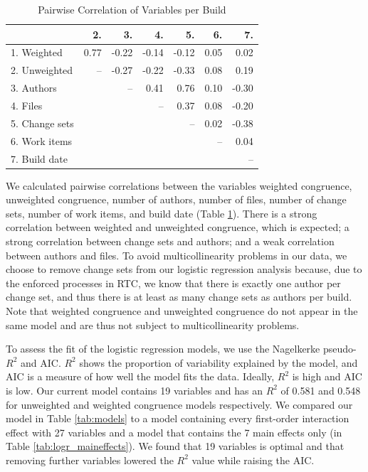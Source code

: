 \begin{table}[t]
\begin{center}
\begin{tabular}{l|rrrrrr}


 & 2. & 3. & 4. & 5. & 6. & 7. \\ 
  \hline
   1. Weighted & 0.77 & -0.22 & -0.14 & -0.12 & 0.05 & 0.02 \\ 
   2. Unweighted  &-- & -0.27 & -0.22 & -0.33 & 0.08 & 0.19 \\ 
   3. Authors &  & --& 0.41 & 0.76 & 0.10 & -0.30 \\ 
   4. Files &  &  & --& 0.37 & 0.08 & -0.20 \\ 
   5. Change sets &  &  &  &  --& 0.02 & -0.38 \\ 
   6. Work items  &  &  &  &  &  --& 0.04 \\ 
   7. Build date &  &  &  &  &  & -- \\ 
\hline

\end{tabular}
\end{center}
\caption{Pairwise Correlation of Variables per Build}
\label{tab:pairwise}
\end{table}

We calculated pairwise correlations between the variables weighted congruence, unweighted congruence, number of authors, number of files, number of change sets, number of work items, and build date (Table \ref{tab:pairwise}). There is a strong correlation between weighted and unweighted congruence, which is expected; a strong correlation between change sets and authors; and a weak correlation between authors and files. To avoid multicollinearity problems in our data, we choose to remove change sets from our logistic regression analysis because, due to the enforced processes in RTC, we know that there is exactly one author per change set, and thus there is at least as many change sets as authors per build. Note that weighted congruence and unweighted congruence do not appear in the same model and are thus not subject to multicollinearity problems.

To assess the fit of the logistic regression models, we use the Nagelkerke pseudo-$R^2$ and AIC. $R^2$ shows the proportion of variability explained by the model, and AIC is a measure of how well the model fits the data. Ideally, $R^2$ is high and AIC is low. Our current model contains 19 variables and has an $R^2$ of 0.581 and 0.548 for unweighted and weighted congruence models respectively. We compared our model in Table \ref{tab:models} to a model containing every first-order interaction effect with 27 variables and a model that contains the 7 main effects only (in Table \ref{tab:logr_maineffects}). We found that 19 variables is optimal and that removing further variables lowered the $R^2$ value while raising the AIC.

